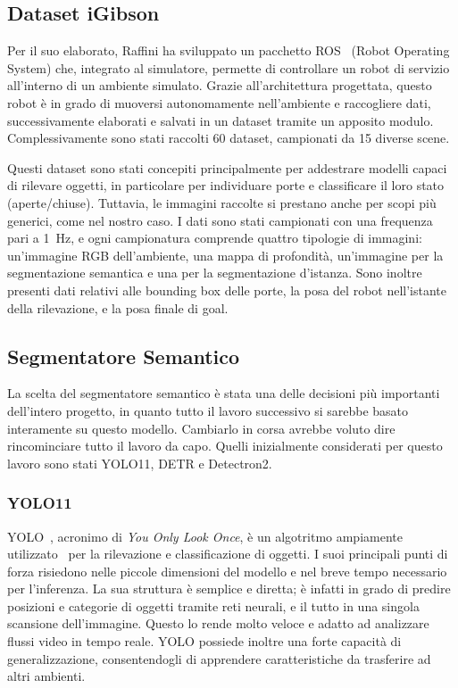 \documentclass[12pt]{report}
\begin{document}
\subsection{Dataset iGibson}
\label{chap:dataset_igibson}

Per il suo elaborato, Raffini ha sviluppato un pacchetto ROS~\cite{quigley2009ros} (Robot Operating System) che, integrato al simulatore, permette di controllare un robot di servizio all'interno di un ambiente simulato. Grazie all'architettura progettata, questo robot è in grado di muoversi autonomamente nell'ambiente e raccogliere dati, successivamente elaborati e salvati in un dataset tramite un apposito modulo. Complessivamente sono stati raccolti 60 dataset, campionati da 15 diverse scene.

Questi dataset sono stati concepiti principalmente per addestrare modelli capaci di rilevare oggetti, in particolare per individuare porte e classificare il loro stato (aperte/chiuse). Tuttavia, le immagini raccolte si prestano anche per scopi più generici, come nel nostro caso. I dati sono stati campionati con una frequenza pari a \SI{1}{\hertz}, e ogni campionatura comprende quattro tipologie di immagini: un'immagine RGB dell'ambiente, una mappa di profondità, un'immagine per la segmentazione semantica e una per la segmentazione d'istanza. Sono inoltre presenti dati relativi alle bounding box delle porte, la posa del robot nell'istante della rilevazione, e la posa finale di goal.

\subsection{Segmentatore Semantico}
\label{chap:segmentatore_semantico}

La scelta del segmentatore semantico è stata una delle decisioni più importanti dell'intero progetto, in quanto tutto il lavoro successivo si sarebbe basato interamente su questo modello. Cambiarlo in corsa avrebbe voluto dire rincominciare tutto il lavoro da capo. Quelli inizialmente considerati per questo lavoro sono stati YOLO11, DETR e Detectron2.

\subsubsection{YOLO11}

YOLO~\cite{JIANG20221066}, acronimo di \textit{You Only Look Once}, è un algotritmo ampiamente utilizzato~\cite{sultana2020review} per la rilevazione e classificazione di oggetti. I suoi principali punti di forza risiedono nelle piccole dimensioni del modello e nel breve tempo necessario per l'inferenza. La sua struttura è semplice e diretta; è infatti in grado di predire posizioni e categorie di oggetti tramite reti neurali, e il tutto in una singola scansione dell'immagine. Questo lo rende molto veloce e adatto ad analizzare flussi video in tempo reale. YOLO possiede inoltre una forte capacità di generalizzazione, consentendogli di apprendere caratteristiche da trasferire ad altri ambienti.
\end{document}
